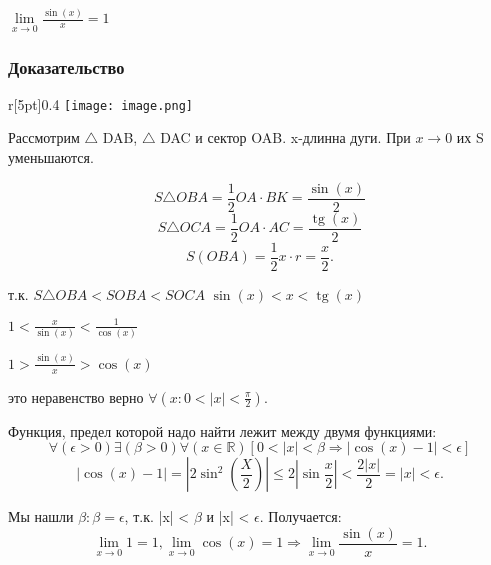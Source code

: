 \opred
 $\lim\limits_{x\rightarrow 0} \frac{\sin(x)}{x}=1$

\subsubsection{Доказательство}
\begin{wrapfigure}{r}[5pt]{0.4\textwidth}
	\texttt{[image: image.png]}
\end{wrapfigure}

Рассмотрим $\triangle$ DAB, $\triangle$ DAC и сектор OAB.
x-длинна дуги.
При $x \rightarrow 0$ их S уменьшаются.


$$ S\triangle{OBA} = \frac{1}{2}OA \cdot BK = \frac{\sin(x)}{2}$$
$$ S\triangle{OCA} = \frac{1}{2}OA \cdot AC = \frac{\operatorname{tg}(x)}{2}$$
$$ S(OBA) = \frac{1}{2}x \cdot r = \frac{x}{2}.$$

т.к. $ S\triangle OBA < SOBA < SOCA$
$\sin(x) < x < \operatorname{tg}(x)$

  $1  < \frac{x}{\sin(x)} < \frac{1}{\cos(x)}$

  $1 > \frac{\sin(x)}{x} > \cos(x)$

  это неравенство верно $\forall (x: 0 < |x|<\frac{\pi}{2})$.

  Функция, предел которой надо найти лежит между двумя функциями:
   $$\forall(\epsilon>0)\exists(\beta>0)\forall(x \in \mathbb{R})[0 < |x| <\beta \Rightarrow |\cos(x) - 1| < \epsilon]$$
  $$|\cos(x) - 1| = |2\sin^2(\frac{X}{2})| \leq 2|\sin\frac{x}{2}| < \frac{2|x|}{2} = |x| < \epsilon.$$

  Мы нашли $\beta : \beta = \epsilon$, т.к. |x| < $\beta$ и |x| < $\epsilon$. Получается:
  $$\lim\limits_{x\rightarrow 0}1=1, \lim\limits_{x \rightarrow 0}\cos(x) = 1
  \Rightarrow \lim\limits_{x \rightarrow 0}\frac{\sin(x)}{x}=1.$$
